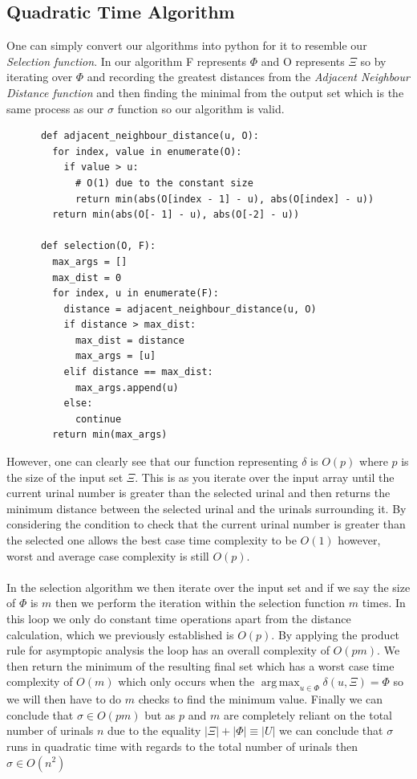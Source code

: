 \documentclass{article}
\DeclareMathOperator*{\argmax}{arg\,max}
\begin{document}
\subsection{Quadratic Time Algorithm}
One can simply convert our algorithms into python for it to resemble our \textit{Selection function}. In our algorithm F represents $\Phi$ and O represents $\Xi$ so by iterating over $\Phi$ and recording the greatest distances from the \textit{Adjacent Neighbour Distance function} and then finding the minimal from the output set which is the same process as our $\sigma$ function so our algorithm is valid.\hfill\\
\begin{center}
    \begin{lstlisting}
      def adjacent_neighbour_distance(u, O):
        for index, value in enumerate(O):
          if value > u:
            # O(1) due to the constant size
            return min(abs(O[index - 1] - u), abs(O[index] - u))
        return min(abs(O[- 1] - u), abs(O[-2] - u))
        
      def selection(O, F):
        max_args = []
        max_dist = 0
        for index, u in enumerate(F):
          distance = adjacent_neighbour_distance(u, O)
          if distance > max_dist:
            max_dist = distance
            max_args = [u]
          elif distance == max_dist:
            max_args.append(u)
          else:
            continue
        return min(max_args)
    \end{lstlisting}
\end{center}
However, one can clearly see that our function representing $\delta$ is $O(p)$ where $p$ is the size of the input set $\Xi$. This is as you iterate over the input array until the current urinal number is greater than the selected urinal and then returns the minimum distance between the selected urinal and the urinals surrounding it. By considering the condition to check that the current urinal number is greater than the selected one allows the best case time complexity to be $O(1)$ however, worst and average case complexity is still $O(p)$.\\\\
In the selection algorithm we then iterate over the input set and if we say the size of $\Phi$ is $m$ then we perform the iteration within the selection function $m$ times. In this loop we only do constant time operations apart from the distance calculation, which we previously established is $O(p)$. By applying the product rule for asymptopic analysis the loop has an overall complexity of $O(pm)$. We then return the minimum of the resulting final set which has a worst case time complexity of $O(m)$ which only occurs when the $\argmax_{u \in \Phi} \delta(u, \Xi) = \Phi$ so we will then have to do $m$ checks to find the minimum value. Finally we can conclude that $\sigma \in O(pm)$ but as $p$ and $m$ are completely reliant on the total number of urinals $n$ due to the equality $\left|\Xi\right| + \left|\Phi\right| \equiv \left|U\right|$ we can conclude that $\sigma$ runs in quadratic time with regards to the total number of urinals then $\sigma \in O(n^2)$\\\\
\end{document}
